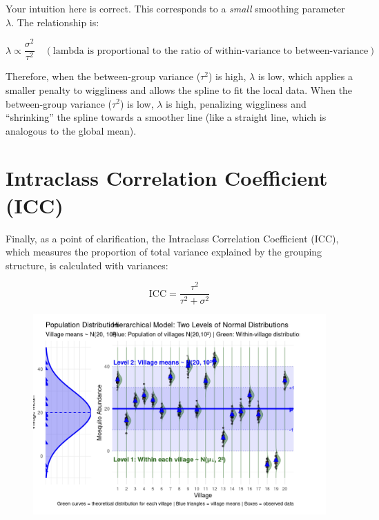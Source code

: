 \documentclass{article}
\begin{document}
Your intuition here is correct. This corresponds to a \emph{small} smoothing parameter $\lambda$. The relationship is:

\begin{equation*}
\lambda \propto \frac{\sigma^2}{\tau^2} \quad (\text{lambda is proportional to the ratio of within-variance to between-variance})
\end{equation*}

Therefore, when the between-group variance ($\tau^2$) is high, $\lambda$ is low, which applies a smaller penalty to wiggliness and allows the spline to fit the local data. When the between-group variance ($\tau^2$) is low, $\lambda$ is high, penalizing wiggliness and ``shrinking'' the spline towards a smoother line (like a straight line, which is analogous to the global mean).

\section*{Intraclass Correlation Coefficient (ICC)}

Finally, as a point of clarification, the Intraclass Correlation Coefficient (ICC), which measures the proportion of total variance explained by the grouping structure, is calculated with variances:

\begin{equation*}
\text{ICC} = \frac{\tau^2}{\tau^2 + \sigma^2}
\end{equation*}

\begin{figure}
    \centering
    \includegraphics[width=1\linewidth]{overviews//general-cheatsheet/image.png}
\end{figure}
\end{document}
